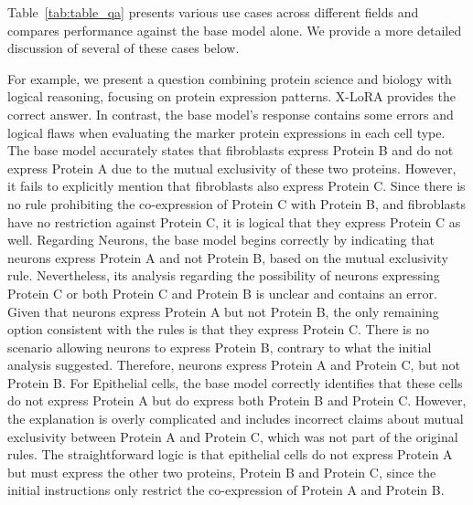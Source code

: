Table~\ref{tab:table_qa} presents various use cases across different fields and compares performance against the base model alone. We provide a more detailed discussion of several of these cases below.

For example, we present a question combining protein science and biology with logical reasoning, focusing on protein expression patterns. X-LoRA provides the correct answer. In contrast, the base model's response contains some errors and logical flaws when evaluating the marker protein expressions in each cell type. The base model accurately states that fibroblasts express Protein B and do not express Protein A due to the mutual exclusivity of these two proteins. However, it fails to explicitly mention that fibroblasts also express Protein C. Since there is no rule prohibiting the co-expression of Protein C with Protein B, and fibroblasts have no restriction against Protein C, it is logical that they express Protein C as well. Regarding Neurons, the base model begins correctly by indicating that neurons express Protein A and not Protein B, based on the mutual exclusivity rule. Nevertheless, its analysis regarding the possibility of neurons expressing Protein C or both Protein C and Protein B is unclear and contains an error. Given that neurons express Protein A but not Protein B, the only remaining option consistent with the rules is that they express Protein C. There is no scenario allowing neurons to express Protein B, contrary to what the initial analysis suggested. Therefore, neurons express Protein A and Protein C, but not Protein B. For Epithelial cells, the base model correctly identifies that these cells do not express Protein A but do express both Protein B and Protein C. However, the explanation is overly complicated and includes incorrect claims about mutual exclusivity between Protein A and Protein C, which was not part of the original rules. The straightforward logic is that epithelial cells do not express Protein A but must express the other two proteins, Protein B and Protein C, since the initial instructions only restrict the co-expression of Protein A and Protein B.


